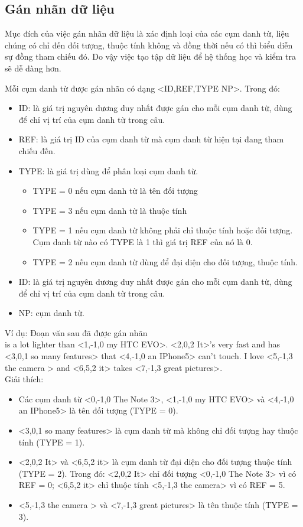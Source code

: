\documentclass[12pt]{extarticle}
\begin{document}
		\subsection{Gán nhãn dữ liệu}
			\par Mục đích của việc gán nhãn dữ liệu là xác định loại của các cụm danh từ, liệu chúng có chỉ đến đối tượng, thuộc tính không và đồng thời nếu có thì biểu diễn sự đồng tham chiếu đó. Do vậy việc tạo tập dữ liệu để hệ thống học và kiểm tra sẽ dễ dàng hơn.
			\par Mỗi cụm danh từ được gán nhãn có dạng <ID,REF,TYPE NP>. Trong đó:
				\begin{itemize}
					\item{ID: là giá trị nguyên dương duy nhất được gán cho mỗi cụm danh từ, dùng để chỉ vị trí của cụm danh từ trong câu.}
					\item{REF: là giá trị ID của cụm danh từ mà cụm danh từ hiện tại đang  tham chiếu đến.}
					\item{TYPE: là giá trị dùng để phân loại cụm danh từ. 
						\begin{itemize}
							\item{TYPE = 0 nếu cụm danh từ là tên đối tượng}
							\item{TYPE = 3 nếu cụm danh từ là thuộc tính}
							\item{TYPE = 1 nếu cụm danh từ không phải chỉ thuộc tính hoặc đối tượng. Cụm danh từ nào có TYPE là 1 thì giá trị REF của nó là 0.}
							\item{TYPE = 2 nếu cụm danh từ dùng để đại diện cho đối tượng, thuộc tính.}
						\end{itemize}}
					\item{ID: là giá trị nguyên dương duy nhất được gán cho mỗi cụm danh từ, dùng để chỉ vị trí của cụm danh từ trong câu.}
					\item{NP: cụm danh từ.}
				\end{itemize}
			\par Ví dụ: Đoạn văn sau đã được gán nhãn
				\\<0,-1,0 The Note 3> is a lot lighter than <1,-1,0 my HTC EVO>. <2,0,2 It>'s very fast and has <3,0,1 so many features> that <4,-1,0 an IPhone5> can't touch. I love <5,-1,3 the camera > and <6,5,2 it> takes <7,-1,3 great pictures>.
				\\Giải thích: 
				\begin{itemize}
					\item{Các cụm danh từ <0,-1,0 The Note 3>, <1,-1,0 my HTC EVO> và <4,-1,0 an IPhone5> là tên đối tượng (TYPE = 0).}
					\item{<3,0,1 so many features> là cụm danh từ mà không chỉ đối tượng hay thuộc tính (TYPE = 1).}
					\item{<2,0,2 It> và <6,5,2 it> là cụm danh từ đại diện cho đối tượng thuộc tính (TYPE = 2). Trong đó: <2,0,2 It> chỉ đối tượng <0,-1,0 The Note 3> vì có REF = 0; <6,5,2 it> chỉ thuộc tính <5,-1,3 the camera> vì có REF = 5.}
					\item{<5,-1,3 the camera > và <7,-1,3 great pictures> là tên thuộc tính (TYPE = 3).}
				\end{itemize} 
\end{document}
